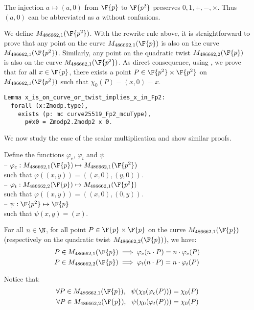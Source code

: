 The injection $a \mapsto (a,0)$ from $\F{p}$ to $\F{p^2}$ preserves
$0, 1, +, -, \times$. Thus $(a,0)$ can be abbreviated as $a$ without confusions.

We define $M_{486662,1}(\F{p^2})$. With the rewrite rule above, it is straightforward
to prove that any point on the curve $M_{486662,1}(\F{p})$ is also on the curve
$M_{486662,1}(\F{p^2})$. Similarly, any point on the quadratic twist
$M_{486662,2}(\F{p})$ is also on the curve $M_{486662,1}(\F{p^2})$.
As direct consequence, using , we prove that for all
$x \in \F{p}$, there exists a point $P \in \F{p^2}\times\F{p^2}$ on
$M_{486662,1}(\F{p^2})$ such that $\chi_0(P) = (x,0) = x$.

\begin{lstlisting}[language=Coq]
Lemma x_is_on_curve_or_twist_implies_x_in_Fp2:
  forall (x:Zmodp.type),
    exists (p: mc curve25519_Fp2_mcuType),
      p#x0 = Zmodp2.Zmodp2 x 0.
\end{lstlisting}

We now study the case of the scalar multiplication and show similar proofs.
\begin{dfn}
Define the functions $\varphi_c$, $\varphi_t$ and $\psi$\\
-- $\varphi_c: M_{486662,1}(\F{p}) \mapsto M_{486662,1}(\F{p^2})$\\
  such that $\varphi((x,y)) = ((x,0), (y,0))$.\\
-- $\varphi_t: M_{486662,2}(\F{p}) \mapsto M_{486662,1}(\F{p^2})$\\
  such that $\varphi((x,y)) = ((x,0), (0,y))$.\\
-- $\psi: \F{p^2} \mapsto \F{p}$\\
  such that $\psi(x,y) = (x)$.
\end{dfn}

\begin{lemma}
  \label{lemma:proj}
  For all $n \in \N$, for all point $P\in\F{p}\times\F{p}$ on the curve
  $M_{486662,1}(\F{p})$ (respectively on the quadratic twist $M_{486662,2}(\F{p})$), we have:
  \begin{align*}
  P \in M_{486662,1}(\F{p}) &\implies \varphi_c(n \cdot P) = n \cdot \varphi_c(P)\\
  P \in M_{486662,2}(\F{p}) &\implies \varphi_t(n \cdot P) = n \cdot \varphi_t(P)
  \end{align*}
\end{lemma}
Notice that:
\begin{align*}
\forall P \in M_{486662,1}(\F{p}),\ \ \psi(\chi_0(\varphi_c(P))) = \chi_0(P)\\
\forall P \in M_{486662,2}(\F{p}),\ \ \psi(\chi_0(\varphi_t(P))) = \chi_0(P)
\end{align*}


